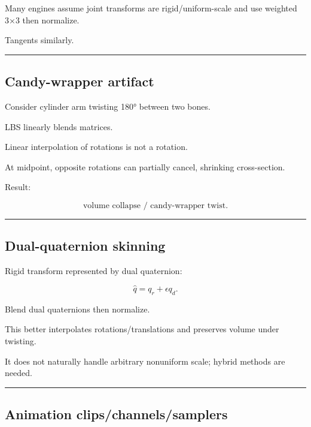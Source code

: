 Many engines assume joint transforms are rigid/uniform-scale and use weighted 3×3 then normalize.

Tangents similarly.

\begin{center}\rule{0.5\linewidth}{0.5pt}\end{center}

\subsection{Candy-wrapper artifact}\label{04-visual-computing-ii-ch041-candy-wrapper-artifact}

Consider cylinder arm twisting 180° between two bones.

LBS linearly blends matrices.

Linear interpolation of rotations is not a rotation.

At midpoint, opposite rotations can partially cancel, shrinking cross-section.

Result:

\[
\boxed{
\text{volume collapse / candy-wrapper twist}.
}
\]

\begin{center}\rule{0.5\linewidth}{0.5pt}\end{center}

\subsection{Dual-quaternion skinning}\label{04-visual-computing-ii-ch041-dual-quaternion-skinning}

Rigid transform represented by dual quaternion:

\[
\hat q=
q_r+
\epsilon q_d.
\]

Blend dual quaternions then normalize.

This better interpolates rotations/translations and preserves volume under twisting.

It does not naturally handle arbitrary nonuniform scale; hybrid methods are needed.

\begin{center}\rule{0.5\linewidth}{0.5pt}\end{center}

\subsection{Animation clips/channels/samplers}\label{04-visual-computing-ii-ch041-animation-clipschannelssamplers}

